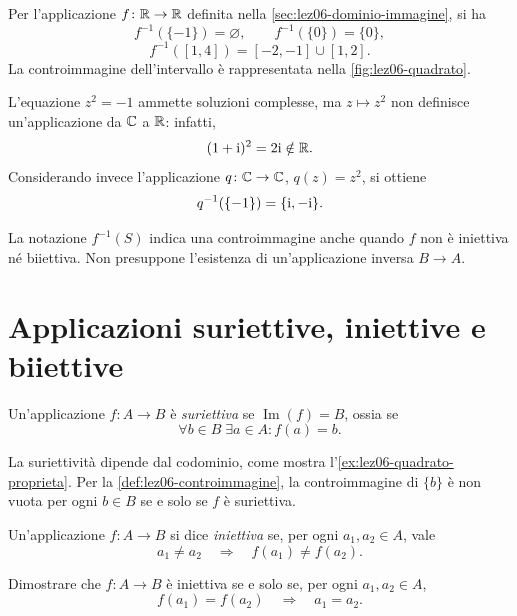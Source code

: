 \begin{example}
\label{ex:lez06-controimmagini-quadrato}
Per l'applicazione \(f\colon\mathbb{R}\to\mathbb{R}\) definita
nella \cref{sec:lez06-dominio-immagine}, si ha
\[
  f^{-1}(\{-1\})=\varnothing,
  \qquad
  f^{-1}(\{0\})=\{0\},
\]
\[
  f^{-1}([1,4])=[-2,-1]\cup[1,2].
\]
La controimmagine dell'intervallo è
rappresentata nella \cref{fig:lez06-quadrato}.

L'equazione \(z^2=-1\) ammette soluzioni
complesse, ma \(z\mapsto z^2\) non definisce
un'applicazione da \(\mathbb{C}\) a \(\mathbb{R}\): infatti,
\[
  (1+\mathrm{i})^2
  =2\mathrm{i}\notin\mathbb{R}.
\]
Considerando invece l'applicazione
\(q\colon\mathbb{C}\to\mathbb{C}\), \(q(z)=z^2\), si ottiene
\[
  q^{-1}(\{-1\})
  =\{\mathrm{i},-\mathrm{i}\}.
\]
\end{example}

La notazione \(f^{-1}(S)\) indica una
controimmagine anche quando \(f\) non è
iniettiva né biiettiva. Non presuppone
l'esistenza di un'applicazione inversa
\(B\to A\).

\section{Applicazioni suriettive, iniettive e biiettive}
\label{sec:lez06-proprieta-applicazioni}

\begin{definition}[Suriettività]
\label{def:lez06-suriettiva}
Un'applicazione \(f\colon A\longrightarrow B\)
è \emph{suriettiva} se \(\operatorname{Im}(f)=B\), ossia se
\[
  \forall b\in B\;\exists a\in A:
  f(a)=b.
\]
\end{definition}

La suriettività dipende dal codominio, come mostra
l'\cref{ex:lez06-quadrato-proprieta}. Per la
\cref{def:lez06-controimmagine}, la controimmagine di
\(\{b\}\) è non vuota per ogni \(b\in B\) se e solo se
\(f\) è suriettiva.

\begin{definition}[Iniettività]
\label{def:lez06-iniettiva}
Un'applicazione \(f\colon A\longrightarrow B\)
si dice \emph{iniettiva} se, per ogni
\(a_1,a_2\in A\), vale
\[
  a_1\ne a_2
  \quad\Longrightarrow\quad
  f(a_1)\ne f(a_2).
\]
\end{definition}

\begin{exercise}
\label{ex:lez06-equivalenza-iniettiva}
Dimostrare che \(f\colon A\to B\) è iniettiva
se e solo se, per ogni \(a_1,a_2\in A\),
\[
  f(a_1)=f(a_2)
  \quad\Longrightarrow\quad
  a_1=a_2.
\]
\end{exercise}

